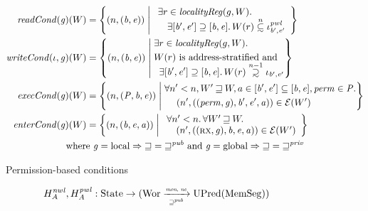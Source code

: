 \documentclass[format=acmsmall, review=true, screen=true]{acmart}
\newcommand{\fun}{\rightarrow}
\newcommand\subsetsim{\mathrel{\ooalign{\raise.2ex\hbox{$\subset$}\cr
      \hidewidth\lower.8ex\hbox{\scalebox{0.9}{$\sim$}}\hidewidth\cr}}}
\newcommand\supsetsim{\mathrel{\ooalign{\raise.2ex\hbox{$\supset$}\cr
      \hidewidth\lower.8ex\hbox{\scalebox{0.9}{$\sim$}}\hidewidth\cr}}}
\newcommand{\nsubsim}[1][n]{\stackrel{\tiny{#1}}{\subsetsim}}
\newcommand{\nsupsim}[1][n]{\stackrel{\tiny{#1}}{\supsetsim}}
\newcommand{\var}[1]{\mathit{#1}}
\newcommand{\gl}{\var{g}}
\newcommand{\addr}{\var{a}}
\newcommand{\start}{\var{b}}
\newcommand{\addrend}{\var{e}}
\newcommand{\perm}{\var{perm}}
\newcommand{\nwl}{\var{nwl}}
\newcommand{\pwl}{\var{pwl}}
\newcommand{\plainfun}[2]{
  \ifthenelse{\equal{#2}{}}
  {\mathit{#1}}
  {\mathit{#1}(#2)}
}
\newcommand{\readCond}[1]{\plainfun{readCond}{#1}}
\newcommand{\writeCond}[1]{\plainfun{writeCond}{#1}}
\newcommand{\execCond}[1]{\plainfun{execCond}{#1}}
\newcommand{\entryCond}[1]{\plainfun{enterCond}{#1}}
\newcommand{\future}{\mathbin{\sqsupseteq}}
\newcommand{\futurewk}{\mathbin{\sqsupseteq}^{\var{pub}}}
\newcommand{\futurestr}{\mathbin{\sqsupseteq}^{\var{priv}}}
\newcommand{\monwknefun}{\xrightarrow[\text{\tiny{$\futurewk$}}]{\textit{\tiny{mon, ne}}}}
\newcommand{\asmType}{\plaindom{AsmType}}
\newcommand{\plaindom}[1]{\mathrm{#1}}
\newcommand{\HeapSegments}{\plaindom{MemSeg}}
\newcommand{\States}{\plaindom{State}}
\newcommand{\Wor}{\plaindom{Wor}}
\newcommand{\UPred}[1]{\plaindom{UPred}(#1)}
\newcommand{\intr}[2]{\mathcal{#1}}
\newcommand{\exprintr}[1]{\intr{E}{#1}}
\newcommand{\stder}{\exprintr{\asmType}}
\newcommand{\npair}[2][n]{\left(#1,#2 \right)}
\newcommand{\npairP}[2][n]{(#1,#2)}
\newcommand{\plainperm}[1]{\textsc{#1}}
\newcommand{\exec}{\plainperm{rx}}
\newcommand{\plainlocality}[1]{\mathrm{#1}}
\newcommand{\local}{\plainlocality{local}}
\newcommand{\glob}{\plainlocality{global}}
\begin{document}
{\begin{figure}[htb]
  \centering
  \begin{align*}
   \readCond{}(\gl)(W) &=  \left\{ \npair{(\start,\addrend)} \; \middle| \;
    \begin{array}{l}
       \exists r \in \var{localityReg}(g,W) \ldotp \\
\quad   \exists [\start',\addrend'] \supseteq [\start,\addrend] \ldotp W(r)\nsubsim[n] \iota_{\start',\addrend'}^\pwl 
    \end{array}
    \right\}\\
   \writeCond{}(\iota,\gl)(W) &=  \left\{
    \npair{(\start,\addrend)}
    \; \middle| \;
    \begin{aligned}
      & \exists r \in \var{localityReg}(g,W) \ldotp \\
      & W(r) \text{ is address-stratified and} \\[-0.2cm]
      & \;\; \exists [\start',\addrend'] \supseteq [\start,\addrend] \ldotp W(r)\nsupsim[n-1] \iota_{\start',\addrend'}
    \end{aligned} \right\}\\
   \execCond{}(\gl)(W) &= 
    \left\{
      \npairP{(\var{P}, \start,\addrend)}
     \; \middle| \;
    \begin{aligned}
      & \forall n' < n, W' \future W, a \in [\start',\addrend'] \subseteq [\start,\addrend], \perm \in \var{P} \ldotp \\
      & \;\;\;\; \npair[n']{((\perm,\gl),\start',\addrend',\addr)} \in \stder(W')\\
    \end{aligned} \right\} \\
   \entryCond{}(\gl)(W) &= 
    \left\{ \npair{(\start,\addrend,\addr)} \; \middle| \;
    \begin{array}{l}
      \forall n' < n \ldotp \forall W' \future W \ldotp\\
      \quad \npair[n']{((\exec,\gl),\start,\addrend,\addr)} \in \stder(W')
    \end{array}
    \right\} \\
   \text{where } \gl = \local \Rightarrow \future = \futurewk \text{ and } \gl = \glob \Rightarrow \future = \futurestr \span
   \end{align*}
\caption{Permission-based conditions}
\label{fig:perm-conds}
\end{figure}
\begin{figure}[htb]
  \begin{align*}
  H^\nwl_A,  H^\pwl_A :{} & \States \fun (\Wor \monwknefun \UPred{\HeapSegments})\\

\end{align*}
\end{figure}}
\end{document}
